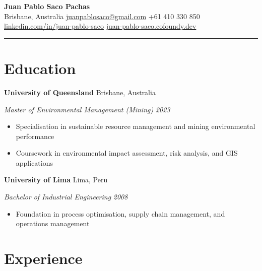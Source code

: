 \documentclass[11pt,letterpaper]{article}
\newcommand{\entry}[4]{%
  \noindent\textbf{#1} \hfill #2 \par\nopagebreak
  \textit{#3} \hfill \textit{#4} \par\nopagebreak
}
\begin{document}
\begin{center}
  {\LARGE\bfseries Juan Pablo Saco Pachas} \\[4pt]
  \enspace Brisbane, Australia
  \quad{}\enspace \href{mailto:juanpablosaco@gmail.com}{juanpablosaco@gmail.com}
  \quad{}\enspace +61 410 330 850
  \\[2pt]
  \enspace \href{https://linkedin.com/in/juan-pablo-saco-a2544737/}{linkedin.com/in/juan-pablo-saco}
  \quad{}\enspace \href{https://juan-pablo-saco.cofoundy.dev}{juan-pablo-saco.cofoundy.dev}
\end{center}

\vspace{-0.4em}
\noindent\rule{\textwidth}{0.8pt}
\vspace{-0.8em}

\section{Education}

\entry{University of Queensland}{Brisbane, Australia}{Master of Environmental Management (Mining)}{2023}
\begin{itemize}
  \item Specialisation in sustainable resource management and mining environmental performance
  \item Coursework in environmental impact assessment, risk analysis, and GIS applications
\end{itemize}
\vspace{0.3em}

\entry{University of Lima}{Lima, Peru}{Bachelor of Industrial Engineering}{2008}
\begin{itemize}
  \item Foundation in process optimisation, supply chain management, and operations management
\end{itemize}
\vspace{0.3em}

\section{Experience}
\end{document}
